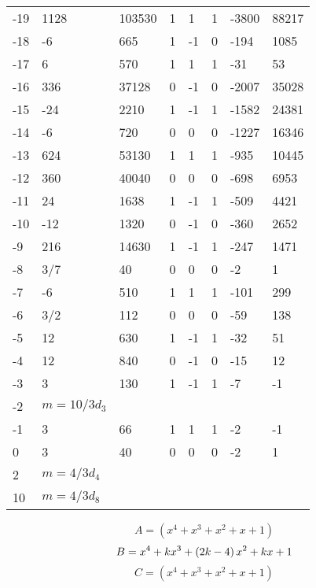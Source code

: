 \documentclass{amsart}
\begin{document}
\begin{longtable}{|l|l|l|lllll|}
-19&1128&103530&1&1&1&-3800&88217\\
-18&-6&665&1&-1&0&-194&1085\\
-17&6&570&1&1&1&-31&53\\
-16&336&37128&0&-1&0&-2007&35028\\
-15&-24&2210&1&-1&1&-1582&24381\\
-14&-6&720&0&0&0&-1227&16346\\
-13&624&53130&1&1&1&-935&10445\\
-12&360&40040&0&0&0&-698&6953\\
-11&24&1638&1&-1&1&-509&4421\\
-10&-12&1320&0&-1&0&-360&2652\\
-9&216&14630&1&-1&1&-247&1471\\
-8&3/7&40&0&0&0&-2&1\\
-7&-6&510&1&1&1&-101&299\\
-6&3/2&112&0&0&0&-59&138\\
-5&12&630&1&-1&1&-32&51\\
-4&12&840&0&-1&0&-15&12\\
-3&3&130&1&-1&1&-7&-1\\
-2&$m=10/3d_{3}$&&\multicolumn{5}{c|}{}\\
-1&3&66&1&1&1&-2&-1\\
0&3&40&0&0&0&-2&1\\
2&$m=4/3d_{4}$&&\multicolumn{5}{c|}{}\\
10&$m=4/3d_{8}$&&\multicolumn{5}{c|}{}\\
\hline
\end{longtable}
$$A=(x^4
 + x^3
 + x^2
 + x
 + 1)$$
$$B=x^4
 + k\*x^3
 + \left(2\*k
 - 4\right) \*x^2
 + k\*x
 + 1$$
$$C=(x^4
 + x^3
 + x^2
 + x
 + 1)$$
\end{document}
